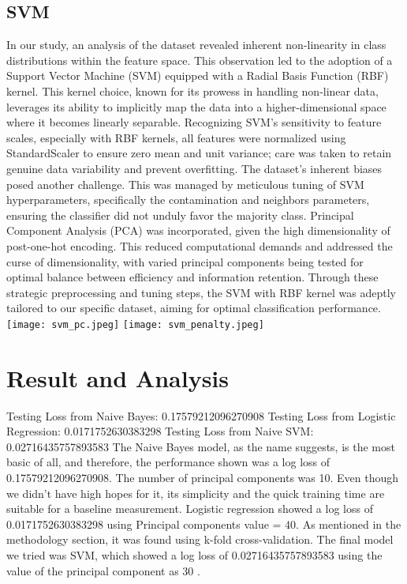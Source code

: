 \documentclass{article}
\begin{document}
\begin{multicols}{2}
\subsection{SVM}
In our study, an analysis of the dataset revealed inherent non-linearity in class distributions within the feature space. This observation led to the adoption of a Support Vector Machine (SVM) equipped with a Radial Basis Function (RBF) kernel. This kernel choice, known for its prowess in handling non-linear data, leverages its ability to implicitly map the data into a higher-dimensional space where it becomes linearly separable. Recognizing SVM's sensitivity to feature scales, especially with RBF kernels, all features were normalized using StandardScaler to ensure zero mean and unit variance; care was taken to retain genuine data variability and prevent overfitting. The dataset's inherent biases posed another challenge. This was managed by meticulous tuning of SVM hyperparameters, specifically the contamination and neighbors parameters, ensuring the classifier did not unduly favor the majority class. Principal Component Analysis (PCA) was incorporated, given the high dimensionality of post-one-hot encoding. This reduced computational demands and addressed the curse of dimensionality, with varied principal components being tested for optimal balance between efficiency and information retention. Through these strategic preprocessing and tuning steps, the SVM with RBF kernel was adeptly tailored to our specific dataset, aiming for optimal classification performance.
\texttt{[image: svm\_pc.jpeg]}
\texttt{[image: svm\_penalty.jpeg]}

\section{Result and Analysis}
Testing Loss from Naive Bayes: 0.17579212096270908
Testing Loss from Logistic Regression: 0.0171752630383298
Testing Loss from Naive SVM: 0.02716435757893583
The Naive Bayes model, as the name suggests, is the most basic of all, and therefore, the performance shown was a log loss of 0.17579212096270908. The number of principal components was 10.  Even though we didn’t have high hopes for it, its simplicity and the quick training time are suitable for a baseline measurement.
Logistic regression showed a log loss of 0.0171752630383298 using Principal components value = 40. As mentioned in the methodology section, it was found using k-fold cross-validation.
The final model we tried was SVM, which showed a log loss of  0.02716435757893583 using the value of the principal component as 30 . 


\end{multicols}
\end{document}
